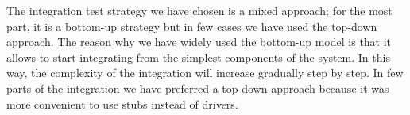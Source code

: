 The integration test strategy we have chosen is a mixed approach; for the most part, it is a bottom-up strategy but in few cases we have used the top-down approach. 
\newline 
The reason why we have widely used the bottom-up model is that it allows to start integrating from the simplest components of the system. In this way, the complexity of the integration will increase gradually step by step.
In few parts of the integration we have preferred a top-down approach because it was more convenient to use stubs instead of drivers.